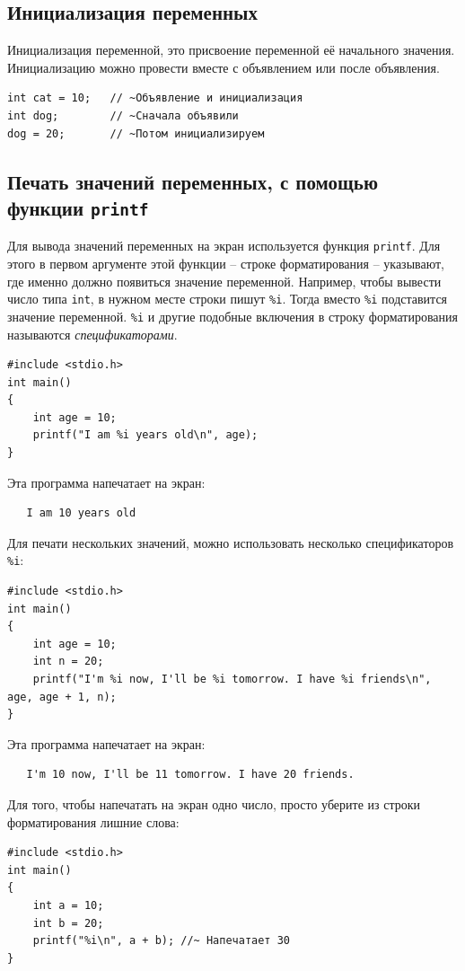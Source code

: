 \documentclass{article}
\begin{document}
\subsection*{Инициализация переменных}
Инициализация переменной, это присвоение переменной её начального значения. Инициализацию можно провести вместе с объявлением или после объявления.
\begin{lstlisting}
int cat = 10;	// ~Объявление и инициализация
int dog;		// ~Сначала объявили
dog = 20;       // ~Потом инициализируем
\end{lstlisting}

\subsection*{Печать значений переменных, с помощью функции \texttt{printf}}
Для вывода значений переменных на экран используется функция \texttt{printf}.
Для этого в первом аргументе этой функции -- строке форматирования -- указывают, где именно должно появиться значение переменной. Например, чтобы вывести число типа \texttt{int}, в нужном месте строки пишут \texttt{\%i}. Тогда вместо  \texttt{\%i}  подставится значение переменной. \texttt{\%i} и другие подобные включения в строку форматирования называются \textit{спецификаторами}.
\begin{lstlisting}
#include <stdio.h>
int main()
{
    int age = 10;
    printf("I am %i years old\n", age);
}
\end{lstlisting}
Эта программа напечатает на экран:
\begin{verbatim}
   I am 10 years old
\end{verbatim}
Для печати нескольких значений, можно использовать несколько спецификаторов \texttt{\%i}:
\begin{lstlisting}
#include <stdio.h>
int main()
{
    int age = 10;
    int n = 20;
    printf("I'm %i now, I'll be %i tomorrow. I have %i friends\n", age, age + 1, n);
}
\end{lstlisting}
Эта программа напечатает на экран:
\begin{verbatim}
   I'm 10 now, I'll be 11 tomorrow. I have 20 friends.
\end{verbatim}
Для того, чтобы напечатать на экран одно число, просто уберите из строки форматирования лишние слова:
\begin{lstlisting}
#include <stdio.h>
int main()
{
    int a = 10;
    int b = 20;
    printf("%i\n", a + b); //~ Напечатает 30
}
\end{lstlisting}
\end{document}
